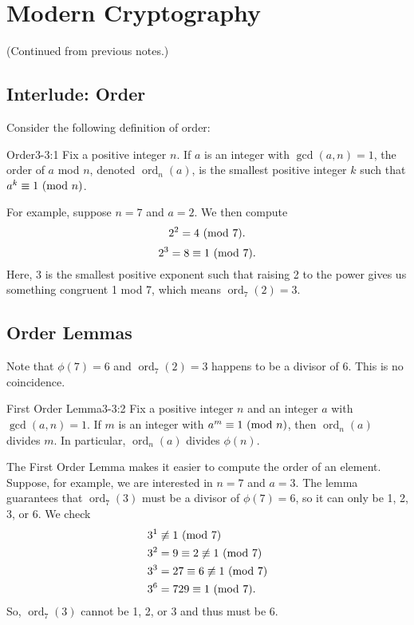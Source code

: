 \documentclass[letterpaper]{article}
\DeclareMathOperator{\ord}{ord}
\begin{document}
\section{Modern Cryptography}
(Continued from previous notes.)

\subsection{Interlude: Order}
Consider the following definition of order: 
\begin{definition}{Order}{3-3:1}
    Fix a positive integer $n$. If $a$ is an integer with $\gcd(a, n) = 1$, the order of $a$ mod $n$, denoted $\ord_{n}(a)$, is the smallest positive integer $k$ such that $a^k \equiv 1 \ (\mathrm{mod}\ n)$.
\end{definition}
For example, suppose $n = 7$ and $a = 2$. We then compute 
\[2^2 = 4 \ (\mathrm{mod}\ 7).\]
\[2^3 = 8 \equiv 1 \ (\mathrm{mod}\ 7).\]
Here, 3 is the smallest positive exponent such that raising 2 to the power gives us something congruent 1 mod 7, which means $\ord_{7}(2) = 3$.

\subsection{Order Lemmas}
Note that $\phi(7) = 6$ and $\ord_{7}(2) = 3$ happens to be a divisor of 6. This is no coincidence. 

\begin{lemma}{First Order Lemma}{3-3:2}
    Fix a positive integer $n$ and an integer $a$ with $\gcd(a, n) = 1$. If $m$ is an integer with $a^m \equiv 1 \ (\mathrm{mod}\ n)$, then $\ord_{n}(a)$ divides $m$. In particular, $\ord_{n}(a)$ divides $\phi(n)$. 
\end{lemma}
The First Order Lemma makes it easier to compute the order of an element. Suppose, for example, we are interested in $n = 7$ and $a = 3$. The lemma guarantees that $\ord_{7}(3)$ must be a divisor of $\phi(7) = 6$, so it can only be 1, 2, 3, or 6. We check
\begin{equation*}
    \begin{aligned}
        &3^1 \not\equiv 1 \ (\mathrm{mod}\ 7) \\ 
        &3^2 = 9 \equiv 2 \not\equiv 1 \ (\mathrm{mod}\ 7) \\ 
        &3^3 = 27 \equiv 6 \not\equiv 1 \ (\mathrm{mod}\ 7) \\ 
        &3^6 = 729 \equiv 1 \ (\mathrm{mod}\ 7).
    \end{aligned}
\end{equation*}
So, $\ord_{7}(3)$ cannot be 1, 2, or 3 and thus must be 6.
\end{document}
